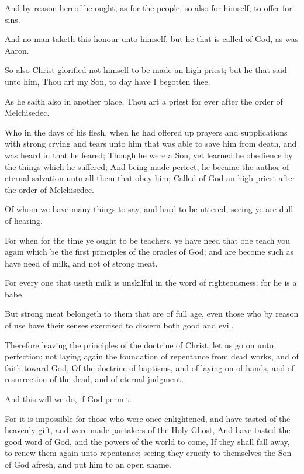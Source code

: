 \Verse And by reason hereof he ought, as for the people, so also for himself, to offer for sins.

\Verse And no man taketh this honour unto himself, but he that is called of God, as was Aaron.

\Verse So also Christ glorified not himself to be made an high priest; but he that said unto him, Thou art my Son, to day have I begotten thee.

\Verse As he saith also in another place, Thou art a priest for ever after the order of Melchisedec.

\Verse Who in the days of his flesh, when he had offered up prayers and supplications with strong crying and tears unto him that was able to save him from death, and was heard in that he feared; \Verse Though he were a Son, yet learned he obedience by the things which he suffered; \Verse And being made perfect, he became the author of eternal salvation unto all them that obey him; \Verse Called of God an high priest after the order of Melchisedec.

\Verse Of whom we have many things to say, and hard to be uttered, seeing ye are dull of hearing.

\Verse For when for the time ye ought to be teachers, ye have need that one teach you again which be the first principles of the oracles of God; and are become such as have need of milk, and not of strong meat.

\Verse For every one that useth milk is unskilful in the word of righteousness: for he is a babe.

\Verse But strong meat belongeth to them that are of full age, even those who by reason of use have their senses exercised to discern both good and evil.


\Chapter
\Verse Therefore leaving the principles of the doctrine of Christ, let us go on unto perfection; not laying again the foundation of repentance from dead works, and of faith toward God, \Verse Of the doctrine of baptisms, and of laying on of hands, and of resurrection of the dead, and of eternal judgment.

\Verse And this will we do, if God permit.

\Verse For it is impossible for those who were once enlightened, and have tasted of the heavenly gift, and were made partakers of the Holy Ghost, \Verse And have tasted the good word of God, and the powers of the world to come, \Verse If they shall fall away, to renew them again unto repentance; seeing they crucify to themselves the Son of God afresh, and put him to an open shame.

